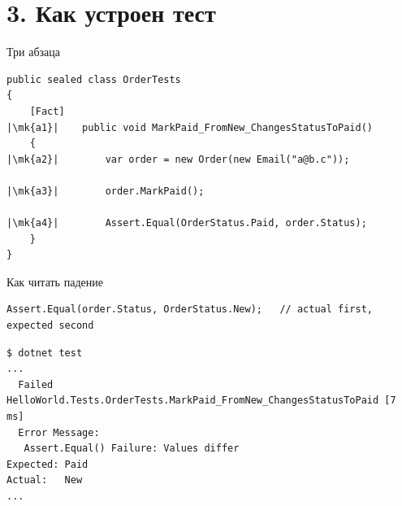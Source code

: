 \documentclass[aspectratio=169,10pt,t]{beamer}
\newcommand{\codesm}{\ttfamily\fontsize{7.6}{9.0}\selectfont}
\newcommand{\codexs}{\ttfamily\fontsize{7.0}{8.3}\selectfont}
\newcommand{\termsm}{\ttfamily\fontsize{6.6}{7.9}\selectfont}
\newcommand{\mk}[1]{\tikz[remember picture,overlay]\coordinate (#1) at (0,0.55ex);}
\begin{document}
\section{3. Как устроен тест}

\begin{frame}[plain]
\end{frame}

\begin{frame}[fragile]{Три абзаца}
  \slidetop

\begin{lstlisting}[style=csharp,basicstyle=\codexs,escapechar=|]
public sealed class OrderTests
{
    [Fact]
|\mk{a1}|    public void MarkPaid_FromNew_ChangesStatusToPaid()
    {
|\mk{a2}|        var order = new Order(new Email("a@b.c"));

|\mk{a3}|        order.MarkPaid();

|\mk{a4}|        Assert.Equal(OrderStatus.Paid, order.Status);
    }
}
\end{lstlisting}

  \vspace{0.4em}
\end{frame}

\begin{frame}[fragile]{Как читать падение}
  \slidetop

\begin{lstlisting}[style=csharp,basicstyle=\codesm]
Assert.Equal(order.Status, OrderStatus.New);   // actual first, expected second
\end{lstlisting}

\begin{lstlisting}[style=term,basicstyle=\termsm]
$ dotnet test
...
  Failed HelloWorld.Tests.OrderTests.MarkPaid_FromNew_ChangesStatusToPaid [7 ms]
  Error Message:
   Assert.Equal() Failure: Values differ
Expected: Paid
Actual:   New
...
\end{lstlisting}

\end{frame}
\end{document}
